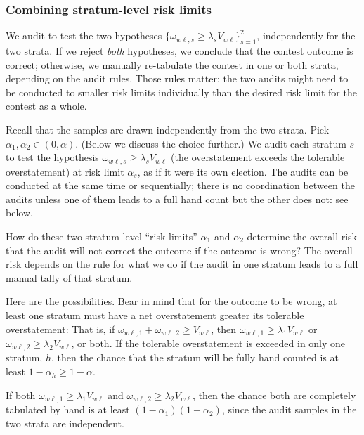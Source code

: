 \subsubsection{Combining stratum-level risk limits}\label{sec:stratumRisk}
We audit to test the two hypotheses $\{\omega_{w\ell,s} \ge \lambda_s V_{w\ell}\}_{s=1}^2$, 
independently for the two strata.
If we reject \emph{both} hypotheses, we conclude that the contest outcome is correct;
otherwise, we manually re-tabulate the contest in one or both strata, depending on the
audit rules.
Those rules matter:
the two audits might need to be conducted to smaller risk limits individually than the desired
risk limit for the contest as a whole.

Recall that the samples are drawn independently from the two strata.
Pick $\alpha_1, \alpha_2 \in (0,\alpha)$.
(Below we discuss the choice further.)
We audit each stratum $s$ to test the hypothesis $\omega_{w\ell,s} \ge \lambda_s V_{w\ell}$ 
(the overstatement exceeds the tolerable overstatement) 
at risk limit $\alpha_s$,
as if it were its own election.
The audits can be conducted at the same time or sequentially; there is no coordination
between the audits unless one of them leads to a full hand count but the other does not:
see below.

How do these two stratum-level ``risk limits'' $\alpha_1$ and
$\alpha_2$ determine the 
overall risk that the audit will not correct the outcome if the outcome is wrong?
The overall risk depends on the rule for what we do if the audit in one stratum leads 
to a full manual tally of that stratum.

Here are the possibilities. Bear in mind that for the outcome to be wrong, 
at least one stratum must have a net overstatement
greater its tolerable overstatement: 
That is, if $\omega_{w\ell,1} + \omega_{w\ell,2} \ge V_{w\ell}$, then $\omega_{w\ell,1}\ge \lambda_1V_{w\ell}$
or $\omega_{w\ell,2}\ge \lambda_2V_{w\ell}$, or both.
If the tolerable overstatement is exceeded in only one stratum, $h$, then the chance that the 
stratum will be fully hand counted is at least $1-\alpha_h \ge 1- \alpha$.

If both $\omega_{w\ell,1} \ge \lambda_1V_{w\ell}$
and $\omega_{w\ell,2} \ge \lambda_2V_{w\ell}$, then the chance both 
are completely tabulated by hand is at least
$(1-\alpha_1)(1-\alpha_2)$, since the audit samples in the two strata are independent.

